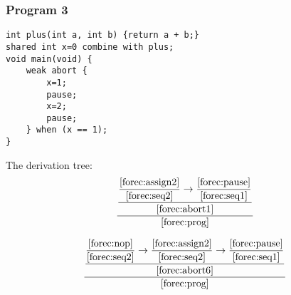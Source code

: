 \subsubsection{Program 3}
\begin{lstlisting}[style=snippet]
int plus(int a, int b) {return a + b;}
shared int x=0 combine with plus;
void main(void) {
	weak abort {
		x=1;
		pause;
		x=2;
		pause;
	} when (x == 1);
}
\end{lstlisting}
The derivation tree:
\begin{equation*}
	\frac{
		\dfrac{
				\dfrac{
					\ref{forec:assign2}
				}{
					\ref{forec:seq2}
				}
				\rightarrow
				\dfrac{
					\ref{forec:pause}
				}{
					\ref{forec:seq1}
				}
			}{
				\ref{forec:abort1}
			}
		}{
			\ref{forec:prog}
		}
\end{equation*}

\begin{equation*}
	\frac{
		\dfrac{
				\dfrac{
					\ref{forec:nop}
				}{
					\ref{forec:seq2}
				}
				\rightarrow
				\dfrac{
					\ref{forec:assign2}
				}{
					\ref{forec:seq2}
				}
				\rightarrow
				\dfrac{
					\ref{forec:pause}
				}{
					\ref{forec:seq1}
				}
			}{
				\ref{forec:abort6}
			}
		}{
			\ref{forec:prog}
		}
\end{equation*}
